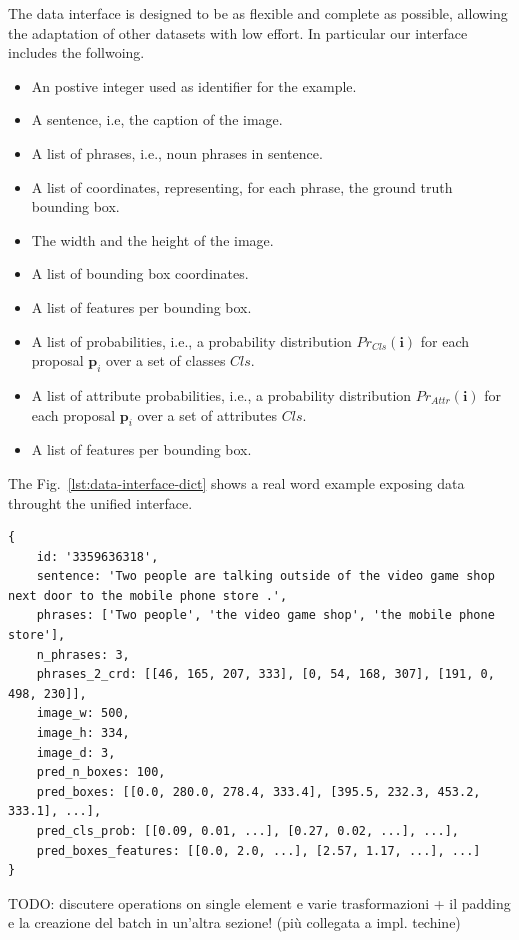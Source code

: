 The data interface is designed to be as flexible and complete as
possible, allowing the adaptation of other datasets with low effort.
In particular our interface includes the follwoing.

\begin{itemize}
  \item An postive integer used as identifier for the example.
  \item A sentence, i.e, the caption of the image.
  \item A list of phrases, i.e., noun phrases in sentence.
  \item A list of coordinates, representing, for each phrase, the
  ground truth bounding box.
  \item The width and the height of the image.
  \item A list of bounding box coordinates.
  \item A list of features per bounding box.
  \item A list of probabilities, i.e., a probability distribution
  $Pr_{Cls}(\bm{i})$ for each proposal $\bm{p}_i$ over a set of
  classes $Cls$.
  \item A list of attribute probabilities, i.e., a probability
  distribution $Pr_{Attr}(\bm{i})$ for each proposal $\bm{p}_i$ over a
  set of attributes $Cls$.
  \item A list of features per bounding box.
\end{itemize}

The Fig.~\ref{lst:data-interface-dict} shows a real word example
exposing data throught the unified interface.

\begin{lstlisting}[style=simplepython,caption=TODO,label={lst:data-interface-dict}]
{
    id: '3359636318', 
    sentence: 'Two people are talking outside of the video game shop next door to the mobile phone store .', 
    phrases: ['Two people', 'the video game shop', 'the mobile phone store'], 
    n_phrases: 3, 
    phrases_2_crd: [[46, 165, 207, 333], [0, 54, 168, 307], [191, 0, 498, 230]], 
    image_w: 500, 
    image_h: 334, 
    image_d: 3, 
    pred_n_boxes: 100, 
    pred_boxes: [[0.0, 280.0, 278.4, 333.4], [395.5, 232.3, 453.2, 333.1], ...], 
    pred_cls_prob: [[0.09, 0.01, ...], [0.27, 0.02, ...], ...],
    pred_boxes_features: [[0.0, 2.0, ...], [2.57, 1.17, ...], ...]
}
\end{lstlisting}

TODO: discutere operations on single element e varie trasformazioni + il padding e la creazione del batch in un'altra sezione! (più collegata a impl. techine) 

